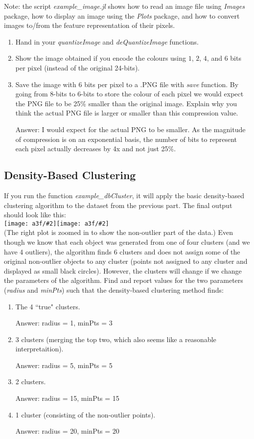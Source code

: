 \documentclass{article}
\def\ans#1{\par\gre{Answer: #1}}
\def\blu#1{{\color{blu}#1}}
\def\gre#1{{\color{gre}#1}}
\newcommand{\fig}[2]{\texttt{[image: a3f/\#2]}}
\def\enum#1{\begin{enumerate}#1\end{enumerate}}
\begin{document}
Note: the script \emph{example\_image.jl} shows how to read an image file using \emph{Images} package, how to display an image using the \emph{Plots} package, and how to convert images to/from the feature representation of their pixels.

\blu{\enum{
\item Hand in your \emph{quantizeImage} and \emph{deQuantizeImage} functions.
\pagebreak
\item Show the image obtained if you encode the colours using $1$, $2$, $4$, and $6$ bits per pixel (instead of the original 24-bits).
\item Save the image with 6 bits per pixel to a .PNG file with \emph{save} function. By going from 8-bits to 6-bits to store the colour of each pixel we would expect the PNG file to be 25\% smaller than the original image. Explain why you think the actual PNG file is larger or smaller than this compression value.
\ans{I would expect for the actual PNG to be smaller. As the magnitude of compression is on an exponential basis, the number of bits to represent each pixel actually decreases by 4x and not just 25\%.}
}
}


\pagebreak

\subsection{Density-Based Clustering}

If you run the function \emph{example\_dbCluster}, it will apply the basic density-based clustering algorithm to the dataset from the previous part. The final output should look like this:\\
\fig{.49}{density}\fig{.49}{density2}\\
(The right plot is zoomed in to show the non-outlier part of the data.)
Even though we know that each object was generated from one of four clusters (and we have 4 outliers), the algorithm finds 6 clusters and does not assign some of the original non-outlier objects to any cluster (points not assigned to any cluster and displayed as small black circles). However, the clusters will change if we change the parameters of the algorithm. Find and report values for the two parameters (\emph{radius} and \emph{minPts}) such that the density-based clustering method finds:
\blu{\enum{
\item The 4 ``true" clusters.
\ans{radius = 1, minPts = 3}
\item 3 clusters (merging the top two, which also seems like a reasonable interpretaition).
\ans{radius = 5, minPts = 5}
\item 2 clusters.
\ans{radius = 15, minPts = 15}
\item 1 cluster (consisting of the non-outlier points).
\ans{radius = 20, minPts = 20}
}}
\end{document}
